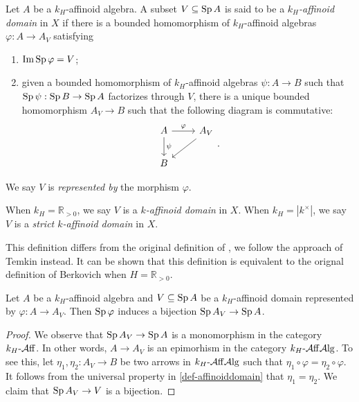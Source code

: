 \begin{definition}\label{def-affinoiddomain}
    Let $A$ be a $k_H$-affinoid algebra. A subset $V\subseteq \operatorname{Sp} A$ is said to be a \emph{$k_H$-affinoid domain} in $X$ if there is a bounded homomorphism of $k_H$-affinoid algebras $\varphi:A\rightarrow A_V$ satisfying 
    \begin{enumerate}
        \item $\operatorname{Im} \operatorname{Sp}\varphi=V$;
        \item given a bounded homomorphism of $k_H$-affinoid algebras $\psi:A\rightarrow B$ such that $\operatorname{Sp} \psi:\operatorname{Sp} B\rightarrow \operatorname{Sp} A$ factorizes through $V$, there is a unique bounded homomorphism $A_V\rightarrow B$ such that the following diagram is commutative:
        \[
            \begin{tikzcd}
                A \arrow[r, "\varphi"] \arrow[d, "\psi"] & A_V \arrow[ld] \\
                B                                        &               
            \end{tikzcd}.
        \]
    \end{enumerate}
    We say $V$ is \emph{represented by} the morphism $\varphi$.

    When $k_H=\mathbb{R}_{>0}$, we say $V$ is a \emph{$k$-affinoid domain} in $X$. When $k_H=|k^{\times}|$, we say $V$ is a \emph{strict $k$-affinoid domain} in $X$.
\end{definition}
\begin{remark}
    This definition differs from the original definition of \cite{Berk12}, we follow the approach of Temkin instead. It can be shown that this definition is equivalent to the orignal definition of Berkovich when $H=\mathbb{R}_{>0}$.
\end{remark}

\begin{proposition}
    Let $A$ be a $k_H$-affinoid algebra and $V\subseteq \operatorname{Sp} A$ be a $k_H$-affinoid domain represented by $\varphi:A\rightarrow A_V$. Then $\operatorname{Sp} \varphi$ induces a bijection $\operatorname{Sp} A_V\rightarrow \operatorname{Sp} A$. 
\end{proposition}
\begin{proof}
    We observe that $\operatorname{Sp} A_V\rightarrow \operatorname{Sp} A$ is a monomorphism in the category $k_H\text{-}\mathcal{A}\mathrm{ff}$. In other words, $A\rightarrow A_V$ is an epimorhism in the category $k_H\text{-}\mathcal{A}\mathrm{ff}\mathcal{A}\mathrm{lg}$. To see this, let $\eta_1,\eta_2:A_V\rightarrow B$ be two arrows in $k_H\text{-}\mathcal{A}\mathrm{ff}\mathcal{A}\mathrm{lg}$ such that $\eta_1\circ \varphi=\eta_2\circ \varphi$. It follows from the universal property in \cref{def-affinoiddomain} that $\eta_1=\eta_2$. We claim that $\operatorname{Sp} A_V\rightarrow V$ is a bijection.
\end{proof}


